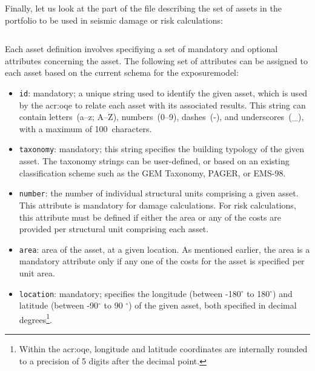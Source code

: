 Finally, let us look at the part of the file describing the set of
\glspl{asset} in the portfolio to be used in seismic damage or risk
calculations:

\inputminted[firstline=17,firstnumber=17,lastline=27,fontsize=\footnotesize,frame=single,linenos,bgcolor=lightgray]{xml}{oqum/risk/verbatim/input_exposure_minimal.xml}

Each \gls{asset} definition involves specifiying a set of mandatory and
optional attributes concerning the \gls{asset}. The following set of
attributes can be assigned to each \gls{asset} based on the current schema for
the \gls{exposuremodel}:

\begin{itemize}

  \item \Verb+id+: mandatory; a unique string used to identify the 
    given \gls{asset}, which is used by the \glsdesc{acr:oqe} to relate each
    \gls{asset} with its associated results. This string can contain 
    letters~(a--z; A--Z), numbers~(0--9), dashes~(-), and underscores~(\_), 
    with a maximum of 100~characters.

  \item \Verb+taxonomy+: mandatory; this string specifies the building typology
    of the given \gls{asset}. The taxonomy strings can be user-defined, or
    based on an existing classification scheme such as the GEM Taxonomy, PAGER,
    or EMS-98.

  \item \Verb+number+: the number of individual structural units comprising a
    given \gls{asset}. This attribute is mandatory for damage calculations. For
    risk calculations, this attribute must be defined if either the area or any
    of the costs are provided per structural unit comprising each \gls{asset}.

  \item \Verb+area+: area of the \gls{asset}, at a given location. As 
    mentioned earlier, the area is a mandatory attribute only if any one of the 
    costs for the \gls{asset} is specified per unit area.

  \item \Verb+location+: mandatory; specifies the longitude 
    (between -180$^{\circ}$ to 180$^{\circ}$) and latitude 
    (between -90$^{\circ}$ to 90 $^{\circ}$) of the given \gls{asset}, both
    specified in decimal degrees\footnote{Within the \glsdesc{acr:oqe}, 
    longitude and latitude coordinates are internally rounded to a precision
    of 5 digits after the decimal point.}.


\end{itemize}
